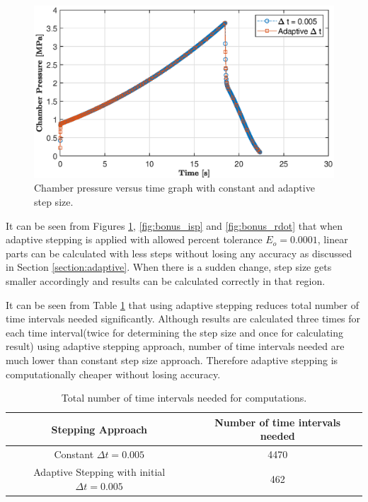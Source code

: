 \documentclass[letterpaper,12pt]{article}
\begin{document}
\begin{figure}[!h]
	\centering
	\includegraphics[height = 8.5 cm]{graphs/bonus_pc.eps}
	\caption{Chamber pressure versus time graph with constant and adaptive step size.}
	\label{fig:bonus_cp}
\end{figure}

It can be seen from Figures \ref{fig:bonus_cp}, \ref{fig:bonus_isp} and \ref{fig:bonus_rdot} that when adaptive stepping is 
applied with allowed percent tolerance $E_o = 0.0001$, linear parts can be calculated with less steps without losing any accuracy as discussed in 
Section \ref{section:adaptive}. When there is a sudden change, step size gets smaller accordingly and results can be calculated correctly in that region.

It can be seen from Table \ref{tbl:timeint} that using adaptive stepping reduces total number of time intervals needed significantly.
Although results are calculated three times for each time interval(twice for determining the step size and once for calculating result) 
using adaptive stepping approach, number of time intervals needed are much lower than constant step size approach. Therefore adaptive stepping is 
computationally cheaper without losing accuracy. 


\begin{table}[!h]
	\begin{center}
	\caption{Total number of time intervals needed for computations.}
	\vspace{1em}
	\label{tbl:timeint}
	\begin{tabular}{|c|c|} 
	\hline
	\multicolumn{1}{|c|}{\bf{Stepping Approach}} & \multicolumn{1}{c|}{\bf{Number of time intervals needed}} \\
	\hline
	Constant $\Delta t = 0.005$ &   4470 \\ \hline
	Adaptive Stepping with initial $\Delta t = 0.005$ &   462 \\ \hline
	\end{tabular}
	\end{center}
\end{table}
\end{document}
